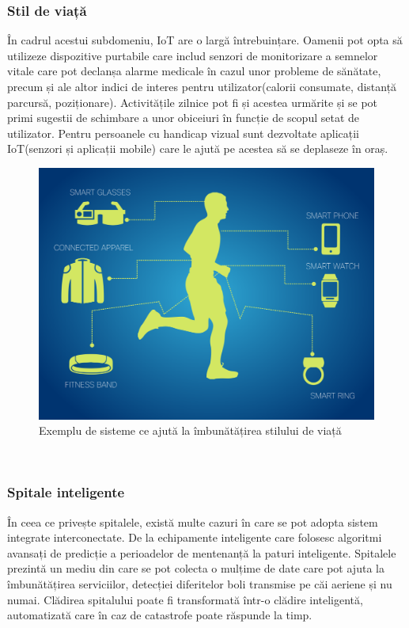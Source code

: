 \documentclass[12pt,a4paper]{report}
\begin{document}
\subsubsection{Stil de viață}
În cadrul acestui subdomeniu, IoT are o largă întrebuințare. Oamenii pot opta să utilizeze dispozitive purtabile care includ senzori de monitorizare a semnelor vitale care pot declanșa alarme medicale în cazul unor probleme de sănătate, precum și ale altor indici de interes pentru utilizator(calorii consumate, distanță parcursă, poziționare). Activitățile zilnice pot fi și acestea urmărite și se pot primi sugestii de schimbare a unor obiceiuri în funcție de scopul setat de utilizator. Pentru persoanele cu handicap vizual sunt dezvoltate aplicații IoT(senzori și aplicații mobile) care le ajută pe acestea să se deplaseze în oraș. 
\begin{figure}[th]
\centering
\includegraphics{pics/iot_health.png}
  \caption{Exemplu de sisteme ce ajută la îmbunătățirea stilului de viață}
  \label{fig:iot_health}
\end{figure}\\
\subsubsection{Spitale inteligente}
În ceea ce privește spitalele, există multe cazuri în care se pot adopta sistem integrate interconectate. De la echipamente inteligente care folosesc algoritmi avansați de predicție a perioadelor de mentenanță la paturi inteligente. Spitalele prezintă un mediu din care se pot colecta o mulțime de date care pot ajuta la îmbunătățirea serviciilor, detecției diferitelor boli transmise pe căi aeriene și nu numai. Clădirea spitalului poate fi transformată într-o clădire inteligentă, automatizată care în caz de catastrofe poate răspunde la timp.
\end{document}
